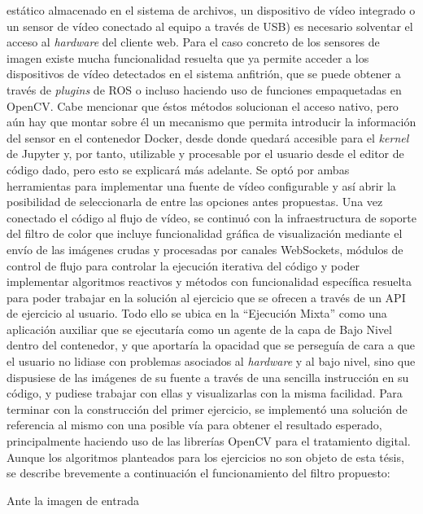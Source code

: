 estático almacenado en el sistema de archivos, un dispositivo de vídeo integrado o un sensor de vídeo conectado al equipo a través de USB) es necesario solventar el acceso al \textit{hardware} del cliente web. Para el caso concreto de los sensores de imagen existe mucha funcionalidad resuelta que ya permite acceder a los dispositivos de vídeo detectados en el sistema anfitrión, que se puede obtener a través de \textit{plugins} de ROS o incluso haciendo uso de funciones empaquetadas en OpenCV. Cabe mencionar que éstos métodos solucionan el acceso nativo, pero aún hay que montar sobre él un mecanismo que permita introducir la información del sensor en el contenedor Docker, desde donde quedará accesible para el \textit{kernel} de Jupyter y, por tanto, utilizable y procesable por el usuario desde el editor de código dado, pero esto se explicará más adelante. Se optó por ambas herramientas para implementar una fuente de vídeo configurable y así abrir la posibilidad de seleccionarla de entre las opciones antes propuestas. Una vez conectado el código al flujo de vídeo, se continuó con la infraestructura de soporte del filtro de color que incluye funcionalidad gráfica de visualización mediante el envío de las imágenes crudas y procesadas por canales WebSockets, módulos de control de flujo para controlar la ejecución iterativa del código y poder implementar algoritmos reactivos y métodos con funcionalidad específica resuelta para poder trabajar en la solución al ejercicio que se ofrecen a través de un API de ejercicio al usuario. Todo ello se ubica en la ``Ejecución Mixta'' como una aplicación auxiliar que se ejecutaría como un agente de la capa de Bajo Nivel dentro del contenedor, y que aportaría la opacidad que se perseguía de cara a que el usuario no lidiase con problemas asociados al \textit{hardware} y al bajo nivel, sino que dispusiese de las imágenes de su fuente a través de una sencilla instrucción en su código, y pudiese trabajar con ellas y visualizarlas con la misma facilidad. Para terminar con la construcción del primer ejercicio, se implementó una solución de referencia al mismo con una posible vía para obtener el resultado esperado, principalmente haciendo uso de las librerías OpenCV para el tratamiento digital. Aunque los algoritmos planteados para los ejercicios no son objeto de esta tésis, se describe brevemente a continuación el funcionamiento del filtro propuesto:
\clearpage
\begin{center}
Ante la imagen de entrada
\end{center}
